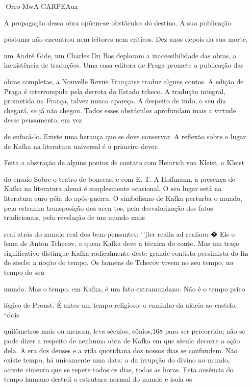 Orro MwA CARPEAux

A propagação dessa obra opõem-se obstãculos do destino. A sua publicação

póstuma não encontrou nem leitores nem críticos. Dez anos depois da sua
morte,

um André Gide, um Charles Du Bos deploram a inacessibilidade das obras,
a inexistência de traduções. Uma casa editora de Praga promete a
publicação das

obras completas, a Nouvelle Revue Françatse traduz alguns contos. A
edição de Praga é interrompida pela derrota do Estado tcheco. A tradução
integral, prometida na França, talvez nunca apareça. A despeito de tudo,
o seu dia chegará, se já não chegou. Todos esses obstáculos aprofundam
mais a virtude desse pensamento, em vez

de sufocá-lo. Existe uma herança que se deve conservar. A reflexão sobre
o lugar de Kafka na literatura universal é o primeiro dever.

Feita a abstração de alguns pontos de contato com Heinrich von Kleist, o
Kleist

do ensaio Sobre o teatro de bonecas, e com E. T. A Hoffmann, a presença
de Kafka na literatura alemã é simplesmente ocasional. O seu lugar está
na literatura euro­ péia do após-guerra. O simbolismo de Kafka perturba
o mundo, pela estranha transposição dos acen­ tos, pela desvalorização
dos fatos tradicionais, pela revelação de um mundo mais

real atrás do mundo real dos bem-pensantes: '\,'jler realia ad realiora
� Eis o lema de Anton Tchecov, a quem Kafka deve a técnica do conto. Mas
um traço significativo distingue Kafka radicalmente deste grande
contista pessimista do fin de siecle: a noção do tempo. Os homens de
Tchecov vivem no seu tempo, no tempo do seu

mundo. Mas o tempo, em Kafka, é um fato extramundano. Não é o tempo
psico­

lógico de Proust. É antes um tempo religioso: o caminho da aldeia ao
castelo, ``dois

quilômetros mais ou menosn, leva séculos, eônios,168 para ser
percorrido; não se pode dizer a respeito de nenhuma obra de Kafka em que
século decorre a ação dela. A era dos deuses e a vida quotidiana dos
nossos dias se confundem. Não existe tempo, há unicamente uma data: a da
irrupção do divino no mundo, aconte­ cimento que se repete todos os
dias, todas as horas. Esta ausência do tempo humano destrói a estrutura
normal do mundo e isola os

